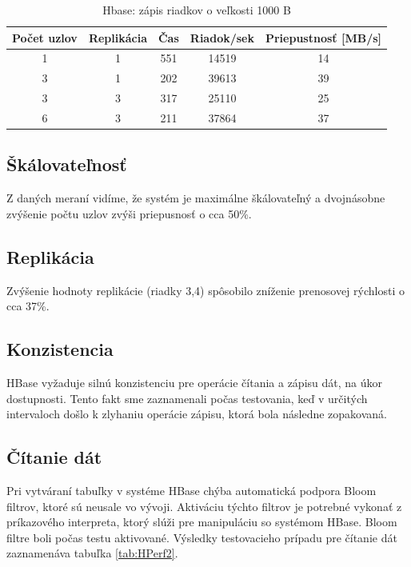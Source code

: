\documentclass[11pt,twoside,a4paper]{book}
\begin{document}
\begin{table}[hp]
\begin{center}
\begin{tabular}{|c|c|c|c|c|}
\hline Počet uzlov & Replikácia  & Čas & Riadok/sek & Priepustnosť [MB/s]\\ 
\hline
\hline 1 & 1 &  551 & 14519 & 14\\ 
\hline 3 & 1 &  202 & 39613 & 39\\ 
\hline 3 & 3 &  317 & 25110 & 25\\ 
\hline 6 & 3 &  211 & 37864 & 37\\ 
\hline
\end{tabular} 
\end{center}
\caption{Hbase: zápis riadkov o veľkosti 1000 B}
\label{tab:HPerf1}
\end{table}

\subsection*{Škálovateľnosť}

Z daných meraní vidíme, že systém je maximálne škálovateľný a dvojnásobne zvýšenie počtu uzlov zvýši priepusnosť o cca 50\%.

\subsection*{Replikácia}

Zvýšenie hodnoty replikácie (riadky 3,4) spôsobilo zníženie prenosovej rýchlosti o cca 37\%.

\subsection*{Konzistencia}

HBase vyžaduje silnú konzistenciu pre operácie čítania a zápisu dát, na úkor dostupnosti. Tento fakt sme zaznamenali počas testovania, keď v určitých intervaloch došlo k zlyhaniu operácie zápisu, ktorá bola následne zopakovaná.

\subsection*{Čítanie dát}

Pri vytváraní tabuľky v systéme HBase chýba automatická podpora Bloom filtrov, ktoré sú neusale vo vývoji. Aktiváciu týchto filtrov je potrebné vykonať z príkazového interpreta, ktorý slúži pre manipuláciu so systémom HBase. Bloom filtre boli počas testu aktivované. Výsledky testovacieho prípadu pre čítanie dát zaznamenáva tabuľka \ref{tab:HPerf2}.
\end{document}
